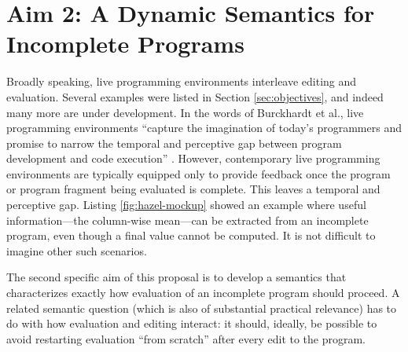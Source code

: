 


\section{Aim 2: A Dynamic Semantics for Incomplete Programs}
\label{sec:dynamics}

Broadly speaking, live programming environments interleave editing and evaluation. 
Several examples were listed in Section \ref{sec:objectives}, and indeed many more
are under development. In the words of Burckhardt et al., live programming environments 
``capture the imagination of today's programmers and promise to narrow the temporal and perceptive gap 
between program development and code execution'' \cite{burckhardt2013s}. However,
contemporary live programming environments are typically equipped only to provide feedback once the program or 
program fragment being evaluated is complete. This leaves a temporal and perceptive gap. Listing \ref{fig:hazel-mockup} showed an example where
useful information---the column-wise mean---can be extracted from an incomplete program, even though a final value cannot be computed. It is not difficult to imagine other such scenarios.

The second specific aim of this proposal is to develop a semantics that characterizes exactly how
evaluation of an incomplete program should proceed. A related semantic question (which is also of 
substantial practical relevance) has to do with how 
evaluation and editing interact: it should, ideally, be possible to avoid restarting
evaluation ``from scratch'' after every edit to the program.


